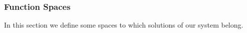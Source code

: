 
\subsubsection{Function Spaces}
In this section we define some spaces to which solutions of our system belong.
